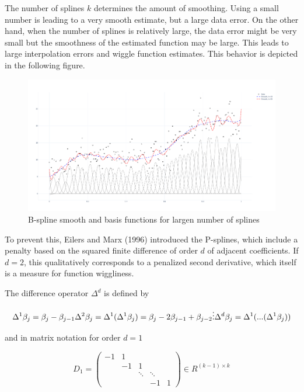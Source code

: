 \documentclass[10pt,a4paper]{article}
\begin{document}
	The number of splines $k$ determines the amount of smoothing. Using a small number is leading to a very smooth estimate, but a large data error. On the other hand, when the number of splines is relatively large, the data error might be very small but the smoothness of the estimated function may be large. This leads to large interpolation errors and wiggle function estimates. This behavior is depicted in the following figure.

	\begin{figure}[H]
		\centering
		\includegraphics[width=\linewidth]{thesisplots/smooth_wiggly_plus_basis.pdf}
		\caption{B-spline smooth and basis functions for largen number of splines}
		\label{fig:smooth_bf_large}
	\end{figure}
	
	To prevent this, Eilers and Marx (1996) introduced the P-splines, which include a penalty based on the squared finite difference of order $d$ of adjacent coefficients. If $d=2$, this qualitatively  corresponds to a penalized second derivative, which itself is a measure for function wiggliness.
	
	The difference operator $\Delta^d$ is defined by
	
	$$\Delta^1 \beta_j = \beta_j - \beta_{j-1} \\ \Delta^2 \beta_j = \Delta^1(\Delta^1 \beta_j) = \beta_j - 2\beta_{j-1} + \beta_{j-2} \\ \vdots \\ \Delta^d \beta_j = \Delta^1(...(\Delta^1 \beta_j))$$
	
	and in matrix notation for order $d=1$
	
	$$D_1 = \begin{pmatrix} -1& 1 &  & &    \\  & -1 & 1 & &  \\  &  & \ddots & \ddots  & \\ & & & -1 & 1 \end{pmatrix} \in R^{(k-1)\times k}$$
	
\end{document}
